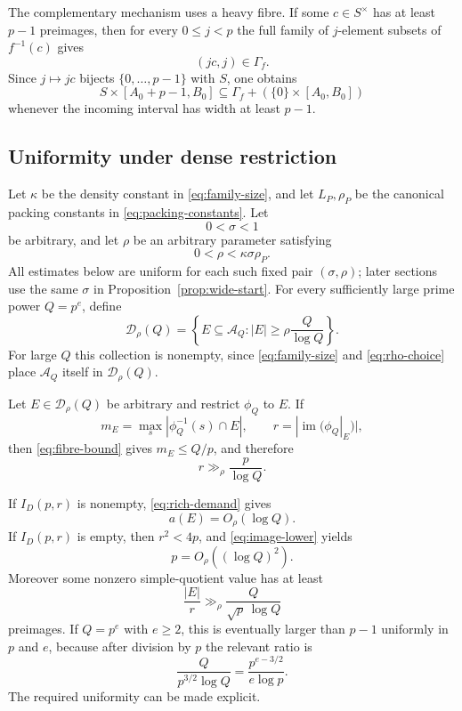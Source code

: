 The complementary mechanism uses a heavy fibre.  If some $c\in S^\times$ has at least $p-1$ preimages, then for every $0\le j<p$ the full family of $j$-element subsets of $f^{-1}(c)$ gives
\[
(jc,j)\in\Gamma_f.
\]
Since $j\mapsto jc$ bijects $\{0,\ldots,p-1\}$ with $S$, one obtains
\begin{equation}\label{eq:poor-rectangle}
S\times[A_0+p-1,B_0]
\subseteq
\Gamma_f+(\{0\}\times[A_0,B_0])
\end{equation}
whenever the incoming interval has width at least $p-1$.

\subsection{Uniformity under dense restriction}

Let $\kappa$ be the density constant in \eqref{eq:family-size}, and let $L_P,\rho_P$ be the canonical packing constants in \eqref{eq:packing-constants}.  Let
\[
0<\sigma<1
\]
be arbitrary, and let $\rho$ be an arbitrary parameter satisfying
\begin{equation}\label{eq:rho-choice}
0<\rho<\kappa\sigma\rho_P.
\end{equation}
All estimates below are uniform for each such fixed pair $(\sigma,\rho)$; later sections use the same $\sigma$ in Proposition~\ref{prop:wide-start}.
For every sufficiently large prime power $Q=p^e$, define
\begin{equation}\label{eq:adm-universal}
\mathcal D_\rho(Q)=
\left\{
E\subseteq\mathcal A_Q:
|E|\ge \rho\frac Q{\log Q}
\right\}.
\end{equation}
For large $Q$ this collection is nonempty, since \eqref{eq:family-size} and \eqref{eq:rho-choice} place $\mathcal A_Q$ itself in $\mathcal D_\rho(Q)$.

Let $E\in\mathcal D_\rho(Q)$ be arbitrary and restrict $\phi_Q$ to $E$.  If
\[
m_E=\max_s|\phi_Q^{-1}(s)\cap E|,
\qquad
r=|\operatorname{im}(\phi_Q|_E)|,
\]
then \eqref{eq:fibre-bound} gives $m_E\le Q/p$, and therefore
\begin{equation}\label{eq:image-lower}
r\gg_\rho\frac p{\log Q}.
\end{equation}

If $I_D(p,r)$ is nonempty, \eqref{eq:rich-demand} gives
\begin{equation}\label{eq:rich-demand-log}
a(E)=O_\rho(\log Q).
\end{equation}
If $I_D(p,r)$ is empty, then $r^2<4p$, and \eqref{eq:image-lower} yields
\begin{equation}\label{eq:poor-p-bound}
p=O_\rho((\log Q)^2).
\end{equation}
Moreover some nonzero simple-quotient value has at least
\begin{equation}\label{eq:heavy-fibre}
\frac{|E|}{r}
\gg_\rho\frac{Q}{\sqrt p\,\log Q}
\end{equation}
preimages.  If $Q=p^e$ with $e\ge2$, this is eventually larger than $p-1$ uniformly in $p$ and $e$, because after division by $p$ the relevant ratio is
\begin{equation}\label{eq:heavy-ratio}
\frac{Q}{p^{3/2}\log Q}
=
\frac{p^{e-3/2}}{e\log p}.
\end{equation}
The required uniformity can be made explicit.

